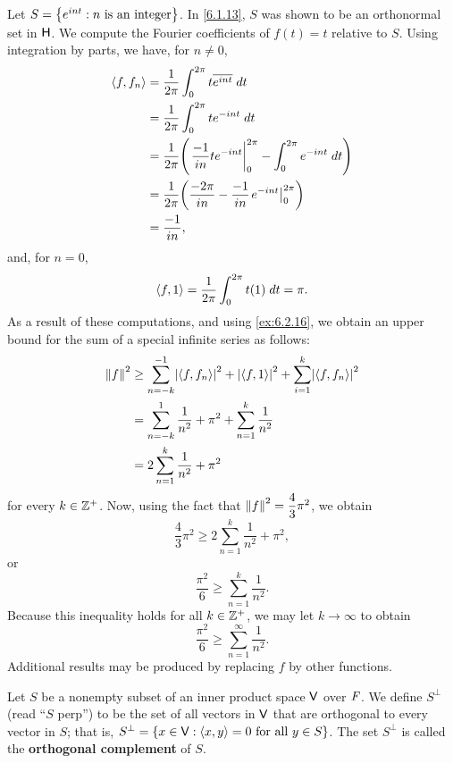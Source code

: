 \begin{eg}\label{6.2.8}
  Let \(S = \left\lbrace e^{int} : n \text{ is an integer}\right\rbrace\).
  In \cref{6.1.13}, \(S\) was shown to be an orthonormal set in \(\mathsf{H}\).
  We compute the Fourier coefficients of \(f(t) = t\) relative to \(S\).
  Using integration by parts, we have, for \(n \neq 0\),
  \begin{align*}
    \inn{f, f_n} & = \dfrac{1}{2 \pi} \int_0^{2 \pi} t \conj{e^{int}} \; dt                                           \\
                 & = \dfrac{1}{2 \pi} \int_0^{2 \pi} t e^{-int} \; dt                                                 \\
                 & = \dfrac{1}{2 \pi} \pa{\eval{\dfrac{-1}{in} t e^{-int}}_0^{2 \pi} - \int_0^{2 \pi} e^{-int} \; dt} \\
                 & = \dfrac{1}{2 \pi} \pa{\dfrac{-2 \pi}{in} - \dfrac{-1}{in} \eval{e^{-int}}_0^{2 \pi}}              \\
                 & = \dfrac{-1}{in},
  \end{align*}
  and, for \(n = 0\),
  \[
    \left\langle f, 1\right\rangle = \dfrac{1}{2 \pi} \int_0^{2 \pi} t(1) \; dt = \pi.
  \]
  As a result of these computations, and using \cref{ex:6.2.16}, we obtain an upper bound for the sum of a special infinite series as follows:
  \begin{align*}
    \norm{f}^2 & \geq \sum_{n = -k}^{-1} \abs{\inn{f, f_n}}^2 + \abs{\inn{f, 1}}^2 + \sum_{i = 1}^k \abs{\inn{f, f_n}}^2 \\
               & = \sum_{n = -k}^1 \dfrac{1}{n^2} + \pi^2 + \sum_{n = 1}^k \dfrac{1}{n^2}                                \\
               & = 2 \sum_{n = 1}^k \dfrac{1}{n^2} + \pi^2
  \end{align*}
  for every \(k \in \mathbb{Z}^+\).
  Now, using the fact that \(\left\lVert f\right\rVert^2 = \dfrac{4}{3} \pi^2\), we obtain
  \[
    \dfrac{4}{3} \pi^2 \geq 2 \sum_{n = 1}^k \dfrac{1}{n^2} + \pi^2,
  \]
  or
  \[
    \dfrac{\pi^2}{6} \geq \sum_{n = 1}^k \dfrac{1}{n^2}.
  \]
  Because this inequality holds for all \(k \in \mathbb{Z}^+\), we may let \(k \to \infty\) to obtain
  \[
    \dfrac{\pi^2}{6} \geq \sum_{n = 1}^\infty \dfrac{1}{n^2}.
  \]
  Additional results may be produced by replacing \(f\) by other functions.
\end{eg}

\begin{defn}\label{6.2.9}
  Let \(S\) be a nonempty subset of an inner product space \(\mathsf{V}\) over \(\mathit{F}\).
  We define \(S^{\perp}\) (read ``\(S\) perp'') to be the set of all vectors in \(\mathsf{V}\) that are orthogonal to every vector in \(S\);
  that is, \(S^{\perp} = \left\lbrace x \in \mathsf{V} : \left\langle x, y\right\rangle = 0 \text{ for all } y \in S\right\rbrace\).
  The set \(S^{\perp}\) is called the \textbf{orthogonal complement} of \(S\).
\end{defn}

